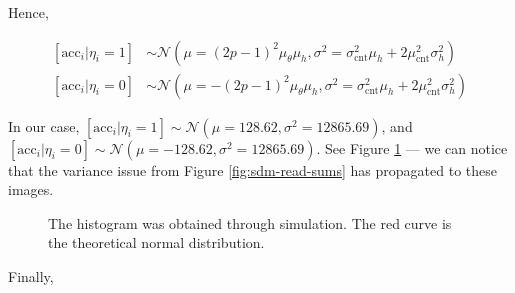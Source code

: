 Hence,

\begin{align}
\left[ \text{acc}_i|\eta_i=1 \right] &\sim \mathcal{N}(\mu = (2p-1)^2 \mu_\theta \mu_h, \sigma^2 = \sigma_\text{cnt}^2 \mu_h + 2 \mu_\text{cnt}^2 \sigma^2_h) \label{eqn:sdm-eta1} \\
\left[ \text{acc}_i|\eta_i=0 \right] &\sim \mathcal{N}(\mu = -(2p-1)^2 \mu_\theta \mu_h, \sigma^2 = \sigma_\text{cnt}^2 \mu_h + 2 \mu_\text{cnt}^2 \sigma^2_h) \label{eqn:sdm-eta0}
\end{align}

In our case, $\left[ \text{acc}_i|\eta_i=1 \right] \sim \mathcal{N}(\mu = 128.62, \sigma^2 = 12865.69)$, and $\left[ \text{acc}_i|\eta_i=0 \right] \sim \mathcal{N}(\mu = -128.62, \sigma^2 = 12865.69)$. See Figure \ref{fig:sdm-read} --- we can notice that the variance issue from Figure \ref{fig:sdm-read-sums} has propagated to these images.

\begin{figure}[h!]
  \centering

  \caption{The histogram was obtained through simulation. The red curve is the theoretical normal distribution.}
  \label{fig:sdm-read}
\end{figure}


Finally,

